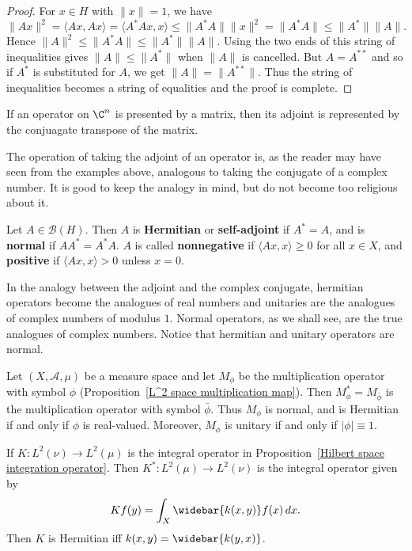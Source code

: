 \begin{proof}
For $x\in H$ with $\|x\|=1$, we have
\[\|Ax\|^2=\langle Ax,Ax\rangle=\langle A^*Ax,x\rangle\leq\|A^*A\|\|x\|^2=\|A^*A\|\leq\|A^*\|\|A\|.\]
Hence $\|A\|^2\leq\|A^*A\|\leq\|A^*\|\|A\|$. Using the two ends of this string of inequalities gives $\|A\|\leq\|A^*\|$ when $\|A\|$ is cancelled. But $A=A^{**}$ and so if $A^*$ is substituted for $A$, we get $\|A\|=\|A^{**}\|$. Thus the string of inequalities becomes a string of equalities and the proof is complete.
\end{proof}
\begin{example}
If an operator on $\C^n$ is presented by a matrix, then its adjoint is represented by the conjuagate transpose of the matrix.
\end{example}
The operation of taking the adjoint of an operator is, as the reader may have seen from the examples above, analogous to taking the conjugate of a complex number. It is good to keep the analogy in mind, but do not become too religious about it.
\begin{definition}
Let $A\in\mathcal{B}(H)$. Then $A$ is \textbf{Hermitian} or \textbf{self-adjoint} if $A^*=A$, and is \textbf{normal} if $AA^*=A^*A$. $A$ is called \textbf{nonnegative} if $\langle Ax,x\rangle\geq 0$ for all $x\in X$, and \textbf{positive} if $\langle Ax,x\rangle>0$ unless $x=0$.
\end{definition}
In the analogy between the adjoint and the complex conjugate, hermitian operators become the analogues of real numbers and unitaries are the analogues of complex numbers of modulus $1$. Normal operators, as we shall see, are the true analogues of complex numbers. Notice that hermitian and unitary operators are normal.
\begin{example}
Let $(X,\mathcal{A},\mu)$ be a measure space and let $M_\phi$ be the multiplication operator with symbol $\phi$ (Proposition~\ref{L^2 space multiplication map}). Then $M_\phi^*=M_{\bar{\phi}}$ is the multiplication operator with symbol $\bar{\phi}$. Thus $M_\phi$ is normal, and is Hermitian if and only if $\phi$ is real-valued. Moreover, $M_\phi$ is unitary if and only if $|\phi|\equiv 1$.
\end{example}
\begin{example}
If $K:L^2(\nu)\to L^2(\mu)$ is the integral operator in Proposition~\ref{Hilbert space integration operator}. Then $K^*:L^2(\mu)\to L^2(\nu)$ is the integral operator given by
\[Kf(y)=\int_X\widebar{k(x,y)}f(x)\,dx.\]
Then $K$ is Hermitian iff $k(x,y)=\widebar{k(y,x)}$.
\end{example}
